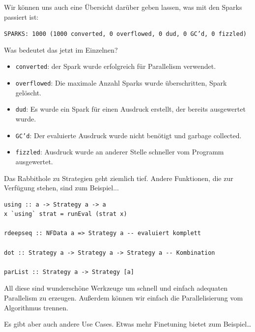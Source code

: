 \documentclass{beamer}
\begin{document}
\begin{frame}
Wir können uns auch eine Übersicht darüber geben lassen, was mit den Sparks passiert ist:

\scriptsize
\texttt{SPARKS: 1000 (1000 converted, 0 overflowed, 0 dud, 0 GC'd, 0 fizzled)}
\normalsize\bigskip
\pause

Was bedeutet das jetzt im Einzelnen?\pause
\begin{itemize}
\item \texttt{converted}: der Spark wurde erfolgreich für Parallelism verwendet.\pause
\item \texttt{overflowed}: Die maximale Anzahl Sparks wurde überschritten, Spark gelöscht.\pause
\item \texttt{dud}: Es wurde ein Spark für einen Ausdruck erstellt, der bereits ausgewertet wurde.\pause
\item \texttt{GC'd}: Der evaluierte Ausdruck wurde nicht benötigt und garbage collected.\pause
\item \texttt{fizzled}: Ausdruck wurde an anderer Stelle schneller vom Programm ausgewertet.
\end{itemize}

\end{frame}


\begin{frame}[fragile]

Das Rabbithole zu Strategien geht ziemlich tief. Andere Funktionen, die zur Verfügung stehen, sind zum Beispiel... \bigskip

\begin{verbatim}
using :: a -> Strategy a -> a
x `using` strat = runEval (strat x)

rdeepseq :: NFData a => Strategy a -- evaluiert komplett

dot :: Strategy a -> Strategy a -> Strategy a -- Kombination

parList :: Strategy a -> Strategy [a]
\end{verbatim}
\pause

All diese sind wunderschöne Werkzeuge um schnell und einfach adequaten Parallelism zu erzeugen. Außerdem können wir einfach die Parallelisierung vom Algorithmus trennen.\bigskip

Es gibt aber auch andere Use Cases. Etwas mehr Finetuning bietet zum Beispiel\dots

\end{frame}
\end{document}
